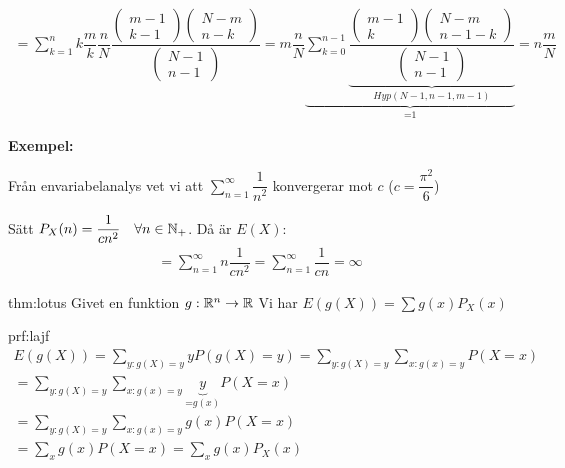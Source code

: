 \begin{equation*}
  \begin{gathered}
    = \sum_{k=1}^{n}k\dfrac{m}{k}\dfrac{n}{N}\dfrac{\begin{pmatrix}m-1\\k-1\end{pmatrix}\begin{pmatrix}N-m\\n-k\end{pmatrix}}{\begin{pmatrix}N-1\\n-1\end{pmatrix}} = m\dfrac{n}{N}\underbrace{\sum_{k=0}^{n-1}\underbrace{\dfrac{\begin{pmatrix}m-1\\k\end{pmatrix}\begin{pmatrix}N-m\\n-1-k\end{pmatrix}}{\begin{pmatrix}N-1\\n-1\end{pmatrix}}}_{\text{$Hyp(N-1,n-1,m-1)$}}
    }_{\text{=1}} = n\dfrac{m}{N}
  \end{gathered}
\end{equation*}
\par\bigskip
\noindent\textbf{Exempel:}\par
\noindent Från envariabelanalys vet vi att $\sum_{n=1}^{\infty}\dfrac{1}{n^2}$ konvergerar mot $c$ ($c = \dfrac{\pi^2}{6}$)\par
\noindent Sätt $P_X(n) = \dfrac{1}{cn^2}\quad \forall n\in\mathbb{N}_+$. Då är $E(X)$:
\begin{equation*}
  \begin{gathered}
    = \sum_{n=1}^{\infty}n\dfrac{1}{cn^2} = \sum_{n=1}^{\infty}\dfrac{1}{cn} = \infty
  \end{gathered}
\end{equation*}
\par\bigskip
\begin{theo}{thm:lotus}
  Givet en funktion $g:\mathbb{R}^n\to\mathbb{R}$ Vi har $E(g(X)) = \sum g(x)P_X(x)$
\end{theo}
\par\bigskip
\begin{prf}{prf:lajf}
  \begin{equation*}
    \begin{gathered}
      E(g(X)) = \sum_{y:g(X)=y} yP(g(X)=y) = \sum_{y:g(X)=y}\sum_{x:g(x)=y}P(X=x)\\
      =\sum_{y:g(X)=y}\sum_{x:g(x)=y}\underbrace{y}_{\text{=$g(x)$}}P(X=x)\\
      =\sum_{y:g(X)=y}\sum_{x:g(x)=y}g(x)P(X=x)\\
      = \sum_{x}g(x)P(X=x) = \sum_{x}g(x)P_X(x)
    \end{gathered}
  \end{equation*}
\end{prf}
